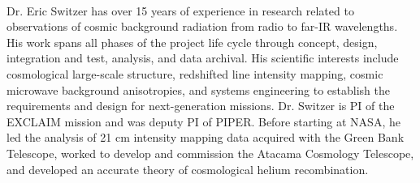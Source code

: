 \documentclass[12pt]{article}
\begin{document}
\vspace{-5mm} \small{ \\ Dr. Eric Switzer
has over 15 years of experience in research related to observations of cosmic
background radiation from radio to far-IR wavelengths. His work spans all
phases of the project life cycle through concept, design, integration and test,
analysis, and data archival. His scientific interests include cosmological
large-scale structure, redshifted line intensity mapping, cosmic microwave
background anisotropies, and systems engineering to establish the requirements
and design for next-generation missions. Dr. Switzer is PI of the EXCLAIM
mission and was deputy PI of PIPER.  Before starting at NASA, he led the
analysis of 21 cm intensity mapping data acquired with the Green Bank
Telescope, worked to develop and commission the Atacama Cosmology Telescope,
and developed an accurate theory of cosmological helium recombination.  }



\vspace{5mm}
\begin{list}{}{%
\setlength{\topsep}{0pt}%
\setlength{\leftmargin}{0.1in}%
\setlength{\listparindent}{-0.1in}%
\setlength{\itemindent}{-0.1in}%
\setlength{\parsep}{\parskip}%
}%

%
%
%
\end{list}
\end{document}
